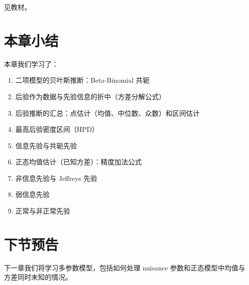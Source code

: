 见教材。

\section{本章小结}

本章我们学习了：
\begin{enumerate}
  \item 二项模型的贝叶斯推断：Beta-Binomial 共轭
  \item 后验作为数据与先验信息的折中（方差分解公式）
  \item 后验推断的汇总：点估计（均值、中位数、众数）和区间估计
  \item 最高后验密度区间（HPD）
  \item 信息先验与共轭先验
  \item 正态均值估计（已知方差）：精度加法公式
  \item 非信息先验与 Jeffreys 先验
  \item 弱信息先验
  \item 正常与非正常先验
\end{enumerate}

\section{下节预告}

下一章我们将学习多参数模型，包括如何处理 nuisance 参数和正态模型中均值与方差同时未知的情况。

\endinput
